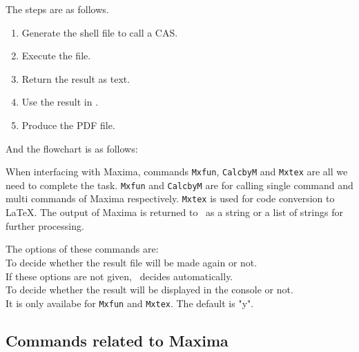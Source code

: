 \documentclass[papersize,a4paper,12pt]{article}
\begin{document}
The steps are as follows.\vspace{-2mm}

\begin{enumerate}
\item Generate the shell file to call a CAS.\vspace{-2mm}
\item Execute the file.\vspace{-2mm}
\item Return the result as text.\vspace{-2mm}
\item Use the result in \ketcindy .\vspace{-2mm}
\item Produce the PDF file.\vspace{-2mm}
\end{enumerate}

And the flowchart is  as follows:
\begin{center}
{\scalebox{0.9}{}}

\end{center}

When interfacing with Maxima, commands \texttt{Mxfun}, \texttt{CalcbyM} and \texttt{Mxtex} are all we need to complete the task. \texttt{Mxfun} and \texttt{CalcbyM} are for calling single command and multi commands of Maxima respectively. \texttt{Mxtex} is used for code conversion to \LaTeX. The output of Maxima  is returned to \ketcindy\ as a string or a list of strings for further processing. 

The options of these commands are:\\
\hspace*{10mm}To decide whether the result file will be  made again or not. \\
\hspace*{10mm}\Ltab{25mm}{}If these options are not given, \ketcindy\ decides automatically.\\
\hspace*{10mm}To decide whether the result will be displayed in the console or not. \\
\hspace*{10mm}\Ltab{25mm}{}It is only availabe for \texttt{Mxfun} and \texttt{Mxtex}.
The default is "y".


\subsection{Commands related to Maxima}
\end{document}
